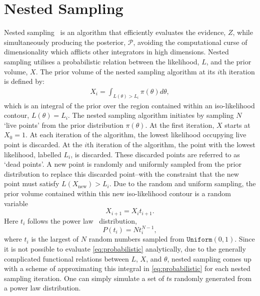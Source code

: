 \section{Nested Sampling}

Nested sampling~\cite{10.1214/06-BA127} is an algorithm that efficiently evaluates the evidence, $Z$, while simultaneously producing the posterior, $\mathcal{P}$, avoiding the computational curse of dimensionality which afflicts other integrators in high dimensions. Nested sampling utilises a probabilistic relation between the likelihood, $L$, and the prior volume, $X$. The prior volume of the nested sampling algorithm at its $i$th iteration is defined by:
%
\begin{align}
X_i = \int_{L(\theta)> L_i} \pi(\theta)d\theta,
\label{eq:probabilistic}
\end{align}
%
which is an integral of the prior over the region contained within an iso-likelihood contour, $L(\theta)=L_{i}$. 
The nested sampling algorithm initiates by sampling $N$ `live points' from the prior distribution $\pi(\theta)$. At the first iteration, $X$ starts at $X_0=1$. At each iteration of the algorithm, the lowest likelihood occupying live point is discarded. At the $i$th iteration of the algorithm, the point with the lowest likelihood, labelled $L_i$, is discarded. These discarded points are referred to as `dead points'. A new point is randomly and uniformly sampled from the prior distribution to replace this discarded point--with the constraint that the new point must satisfy $L(X_{\mathrm{new}})>L_i$. Due to the random and uniform sampling, the prior volume contained within this new iso-likelihood contour is a random variable 
%
\begin{equation}
X_{i+1}=X_{i}t_{i+1}.
\end{equation}
%
Here $t_i$ follows the power law~\cite{Clauset_2009} distribution, 
\begin{equation}
P(t_i)=Nt_i^{N-1},
\end{equation}
where $t_i$ is the largest of $N$ random numbers sampled from $\texttt{Uniform} (0,1)$. Since it is not possible to evaluate \cref{eq:probabilistic} analytically, due to the generally complicated functional relations between $L$, $X$, and $\theta$, nested sampling comes up with a scheme of approximating this integral in \cref{eq:probabilistic} for each nested sampling iteration. One can simply simulate a set of $t$s randomly generated from a power law distribution. 

